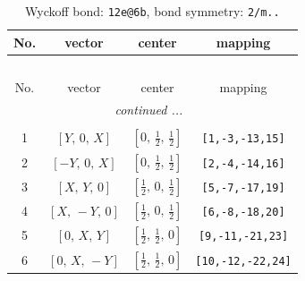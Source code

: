 \documentclass[fleqn,8pt]{jsarticle}
\begin{document}
\renewcommand{\arraystretch}{1.2}
\begin{longtable}{cccc}
\caption{Wyckoff bond: {\tt 12e@6b}, bond symmetry: {\tt 2/m..}}
 \\
 \hline \hline
No. & vector & center & mapping \\ \hline \endfirsthead

\multicolumn{3}{l}{\tablename\ \thetable{}} \\
 \hline \hline
No. & vector & center & mapping \\ \hline \endhead

 \hline \hline
\multicolumn{3}{r}{\footnotesize\it continued ...} \\ \endfoot

 \hline \hline
\multicolumn{3}{r}{} \\ \endlastfoot

1 & $\left[ Y,\, 0,\, X \right]$ & $\left[ 0,\, \frac{1}{2},\, \frac{1}{2} \right]$ & {\tt [1,-3,-13,15]} \\ \hline
2 & $\left[ - Y,\, 0,\, X \right]$ & $\left[ 0,\, \frac{1}{2},\, \frac{1}{2} \right]$ & {\tt [2,-4,-14,16]} \\ \hline
3 & $\left[ X,\, Y,\, 0 \right]$ & $\left[ \frac{1}{2},\, 0,\, \frac{1}{2} \right]$ & {\tt [5,-7,-17,19]} \\ \hline
4 & $\left[ X,\, - Y,\, 0 \right]$ & $\left[ \frac{1}{2},\, 0,\, \frac{1}{2} \right]$ & {\tt [6,-8,-18,20]} \\ \hline
5 & $\left[ 0,\, X,\, Y \right]$ & $\left[ \frac{1}{2},\, \frac{1}{2},\, 0 \right]$ & {\tt [9,-11,-21,23]} \\ \hline
6 & $\left[ 0,\, X,\, - Y \right]$ & $\left[ \frac{1}{2},\, \frac{1}{2},\, 0 \right]$ & {\tt [10,-12,-22,24]} \\
\end{longtable}
\renewcommand{\arraystretch}{1.2}
\end{document}
